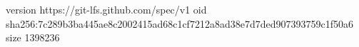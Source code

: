 version https://git-lfs.github.com/spec/v1
oid sha256:7c289b3ba445ae8c2002415ad68c1cf7212a8ad38e7d7ded907393759c1f50a6
size 1398236
